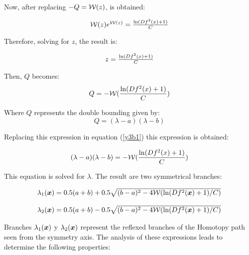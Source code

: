 \documentclass[conference,letterpaper,onecolumn]{IEEEtran}
\newcommand{\pig}[1]{\mbox{\boldmath ${#1}$}	}
\begin{document}
Now, after replacing $-Q={\cal W}(z)$, is obtained:

\begin{displaymath}
\begin{tabular}{c}
${\cal W}(z) e^{{\cal W}(z)}=\frac{\ln(Df^2(x)+1)}{C}$\\
\end{tabular}
\label{y2}
\end{displaymath}

Therefore, solving for $z$, the result is:

\begin{displaymath}
\begin{tabular}{c}
$z=\frac{\ln(Df^2(x)+1)}{C}$\\
\end{tabular}
\label{y3}
\end{displaymath}

Then, $Q$ becomes:
\begin{equation}
Q=-{\cal W}(\frac{\ln(Df^2(x)+1)}{C})
\label{y3b1}
\end{equation}

Where $Q$ represents the double bounding given by:
\begin{displaymath}
Q=(\lambda-a)(\lambda-b)
\end{displaymath}

Replacing this expression in equation (\ref{y3b1}) this expression is obtained:

\begin{displaymath}
(\lambda-a)(\lambda-b)=-{\cal W}(\frac{\ln(Df^2(x)+1)}{C})
\label{y4}
\end{displaymath}

This equation is solved for $\lambda$. The result are two symmetrical branches:

{
\begin{equation}
\begin{array}{l}
\lambda_1(\pig{x})=0.5(a+b)+0.5\sqrt{(b-a)^2-4{\cal{W}}(\ln(Df^2(\pig{x})+1)/C)} \\ \\
\lambda_2(\pig{x})=0.5(a+b)-0.5\sqrt{(b-a)^2-4{\cal{W}}(\ln(Df^2(\pig{x})+1)/C)}
\end{array}
\label{ramass}
\end{equation}
}

Branches $\lambda_1(\pig{x})$ y $\lambda_2(\pig{x})$ represent the reflexed branches of the Homotopy path seen from the symmetry axis. The analysis of these expressions leads to determine the following properties:
\end{document}
